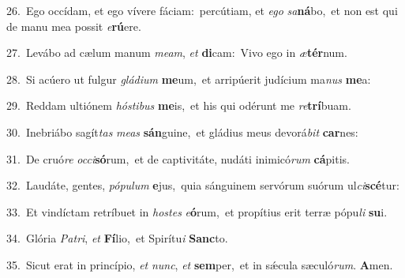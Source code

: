 {\numbfont\textcolor{\numbcolor}{26.}}~Ego occídam, et ego vívere fáciam:~\dagger percútiam, et \textit{e}\-\textit{go} \textit{sa}\-\textbf{ná}bo,~\star et non est qui de manu mea possit \textit{e}\-\textbf{rú}ere.\par
{\numbfont\textcolor{\numbcolor}{27.}}~Levábo ad cælum manum \textit{me}\-\textit{am}, \textit{et} \textbf{di}\-cam:~\star Vivo ego in \textit{æ}\-\textbf{tér}num.\par
{\numbfont\textcolor{\numbcolor}{28.}}~Si acúero ut fulgur \textit{glá}\-\textit{di}\textit{um} \textbf{me}\-um,~\star et arripúerit judícium ma\textit{nus} \textbf{me}\-a:\par
{\numbfont\textcolor{\numbcolor}{29.}}~Reddam ultiónem \textit{hós}\-\textit{ti}\textit{bus} \textbf{me}\-is,~\star et his qui odérunt me \textit{re}\-\textbf{trí}buam.\par
{\numbfont\textcolor{\numbcolor}{30.}}~Inebriábo sagít\textit{tas} \textit{me}\-\textit{as} \textbf{sán}\-guine,~\star et gládius meus devorá\textit{bit} \textbf{car}\-nes:\par
{\numbfont\textcolor{\numbcolor}{31.}}~De cruó\textit{re} \textit{oc}\-\textit{ci}\textbf{só}rum,~\star et de captivitáte, nudáti inimicó\textit{rum} \textbf{cá}\-pitis.\par
{\numbfont\textcolor{\numbcolor}{32.}}~Laudáte, gentes, \textit{pó}\-\textit{pu}\textit{lum} \textbf{e}\-jus,~\star quia sánguinem servórum suórum ul\-\textit{ci}\-\textbf{scé}tur:\par
{\numbfont\textcolor{\numbcolor}{33.}}~Et vindíctam retríbuet in \textit{hos}\-\textit{tes} \textit{e}\-\textbf{ó}rum,~\star et propítius erit terræ pópu\textit{li} \textbf{su}\-i.\par
{\numbfont\textcolor{\numbcolor}{34.}}~Glória \textit{Pa}\-\textit{tri}, \textit{et} \textbf{Fí}\-lio,~\star et Spirítu\textit{i} \textbf{Sanc}\-to.\par
{\numbfont\textcolor{\numbcolor}{35.}}~Sicut erat in princípio, \textit{et} \textit{nunc}\-, \textit{et} \textbf{sem}\-per,~\star et in sǽcula sæculó\-\textit{rum}\-. \textbf{A}\-men.\par
